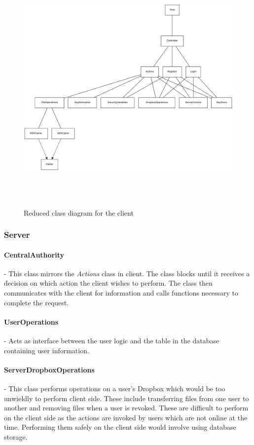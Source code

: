 \documentclass[12pt, titlepage]{article}
\begin{document}
\begin{figure}
\centerline{\includegraphics[height=5.0in,width=8in,angle=0]{client-classDiagram.pdf}}
\caption{Reduced class diagram for the client}
\label{fig:reducedClientClass}
\end{figure}

\subsubsection{Server}

\paragraph*{CentralAuthority} - This class mirrors the \textit{Actions} class in client. The class blocks until it receives a decision on which action the client wishes to perform. The class then communicates with the client for information and calls functions necessary to complete the request.
\paragraph*{UserOperations} - Acts as interface between the user logic and the table in the database containing user information.

\paragraph*{ServerDropboxOperations} - This class performs operations on a user's Dropbox which would be too unwieldly to perform client side. These include transferring files from one user to another and removing files when a user is revoked. These are difficult to perform on the client side as the actions are invoked by users which are not online at the time. Performing them safely on the client side would involve using database storage.
\end{document}
